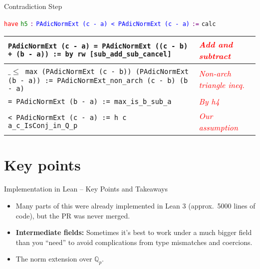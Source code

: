 \documentclass{beamer}
\begin{document}
\begin{frame}{Contradiction Step}

\scriptsize
\textcolor{red}{\texttt{have}} \textcolor{green}{\texttt{h5}} \textcolor{purple}{\texttt{:}} \textcolor{blue}{\texttt{PAdicNormExt (c - a) < PAdicNormExt (c - a)}} \textcolor{purple}{\texttt{:=}} \texttt{calc}

\vspace{1em}

\begin{center}
\begin{tabular}{|m{}|>{\centering\arraybackslash}m{}|}
\hline
\texttt{PAdicNormExt (c - a) = PAdicNormExt ((c - b) + (b - a)) := by rw [sub\_add\_sub\_cancel]} &
\textit{\textcolor{red}{Add and subtract}} \\
\hline
$\_\leq\,$ \texttt{max (PAdicNormExt (c - b)) (PAdicNormExt (b - a)) := PAdicNormExt\_non\_arch (c - b) (b - a)} &
\textit{\textcolor{red}{Non-arch triangle ineq.}} \\
\hline
\texttt{= PAdicNormExt (b - a) := max\_is\_b\_sub\_a} &
\textit{\textcolor{red}{By h4}} \\
\hline
\texttt{< PAdicNormExt (c - a) := h c a\_c\_IsConj\_in\_Q\_p} &
\textit{\textcolor{red}{Our assumption}} \\
\hline
\end{tabular}
\end{center}

\end{frame}
\section{Key points}
\begin{frame}{Implementation in Lean – Key Points and Takeaways}

\begin{itemize}
    \item Many parts of this were already implemented in Lean 3 (approx.\ 5000 lines of code), but the PR was never merged.
    
    \item \textbf{Intermediate fields:} Sometimes it's best to work under a much bigger field than you “need” to avoid complications from type mismatches and coercions.
    
    \item The norm extension over \(\mathbb{Q}_p\).
\end{itemize}

\end{frame}
\end{document}

